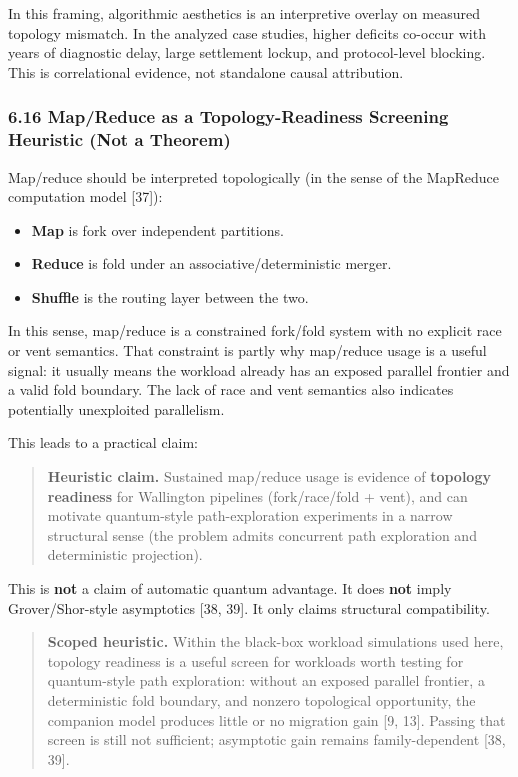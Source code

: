 \documentclass[
  11pt,
]{article}
\begin{document}
In this framing, algorithmic aesthetics is an interpretive overlay on
measured topology mismatch. In the analyzed case studies, higher
deficits co-occur with years of diagnostic delay, large settlement
lockup, and protocol-level blocking. This is correlational evidence, not
standalone causal attribution.

\subsubsection{6.16 Map/Reduce as a Topology-Readiness Screening
Heuristic (Not a
Theorem)}\label{mapreduce-as-a-topology-readiness-screening-heuristic-not-a-theorem}

Map/reduce should be interpreted topologically (in the sense of the
MapReduce computation model {[}37{]}):

\begin{itemize}
\item
  \textbf{Map} is fork over independent partitions.
\item
  \textbf{Reduce} is fold under an associative/deterministic merger.
\item
  \textbf{Shuffle} is the routing layer between the two.
\end{itemize}

In this sense, map/reduce is a constrained fork/fold system with no
explicit race or vent semantics. That constraint is partly why
map/reduce usage is a useful signal: it usually means the workload
already has an exposed parallel frontier and a valid fold boundary. The
lack of race and vent semantics also indicates potentially unexploited
parallelism.

This leads to a practical claim:

\begin{quote}
\textbf{Heuristic claim.} Sustained map/reduce usage is evidence of
\textbf{topology readiness} for Wallington pipelines (fork/race/fold +
vent), and can motivate quantum-style path-exploration experiments in a
narrow structural sense (the problem admits concurrent path exploration
and deterministic projection).
\end{quote}

This is \textbf{not} a claim of automatic quantum advantage. It does
\textbf{not} imply Grover/Shor-style asymptotics {[}38, 39{]}. It only
claims structural compatibility.

\begin{quote}
\textbf{Scoped heuristic.} Within the black-box workload simulations
used here, topology readiness is a useful screen for workloads worth
testing for quantum-style path exploration: without an exposed parallel
frontier, a deterministic fold boundary, and nonzero topological
opportunity, the companion model produces little or no migration gain
{[}9, 13{]}. Passing that screen is still not sufficient; asymptotic
gain remains family-dependent {[}38, 39{]}.
\end{quote}
\end{document}
